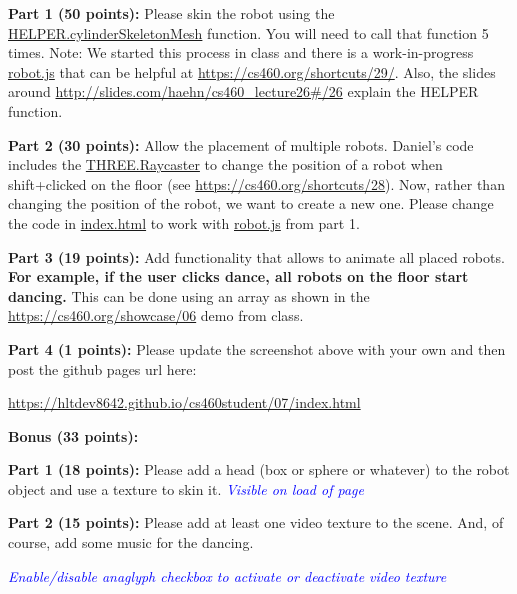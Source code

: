 \documentclass[10pt,oneside,onecolumn,letterpaper]{article}
\begin{document}
\vspace{.5cm}

\noindent\textbf{Part 1 (50 points):} Please skin the robot using the
\url{HELPER.cylinderSkeletonMesh} function. You will need to call that function 5 times. Note: We started this process in class and there is a work-in-progress \url{robot.js} that can be helpful at \url{https://cs460.org/shortcuts/29/}. Also, the slides around \url{http://slides.com/haehn/cs460_lecture26#/26} explain the HELPER function.

\vspace{.5cm}

\noindent\textbf{Part 2 (30 points):} Allow the placement of multiple robots. Daniel's code includes the \url{THREE.Raycaster} to change the position of a robot when shift+clicked on the floor (see \url{https://cs460.org/shortcuts/28}). Now, rather than changing the position of the robot, we want to create a new one. Please change the code in \url{index.html} to work with \url{robot.js} from part 1.

\vspace{.5cm}

\noindent\textbf{Part 3 (19 points):} Add functionality that allows to animate all placed robots. \textbf{For example, if the user clicks dance, all robots on the floor start dancing.} This can be done using an array as shown in the \url{https://cs460.org/showcase/06} demo from class.

\vspace{.25cm}

\noindent\textbf{Part 4 (1 points):} Please update the screenshot above with your own and then post the github pages url here:

\vspace{.5cm}

\url{https://hltdev8642.github.io/cs460student/07/index.html}

\vspace{3cm}

\noindent\textbf{Bonus (33 points):}

\vspace{.5cm}

\noindent\textbf{Part 1 (18 points):} Please add a head (box or sphere or whatever) to the robot object and use a texture to skin it.
\newline
\noindent\textcolor{blue}{\textit{Visible on load of page}}


\vspace{.5cm}

\noindent\textbf{Part 2 (15 points):} Please add at least one video texture to the scene. And, of course, add some music for the dancing.

\newline
\noindent\textcolor{blue}{\textit{Enable/disable anaglyph checkbox to activate or deactivate video texture}}
\end{document}
